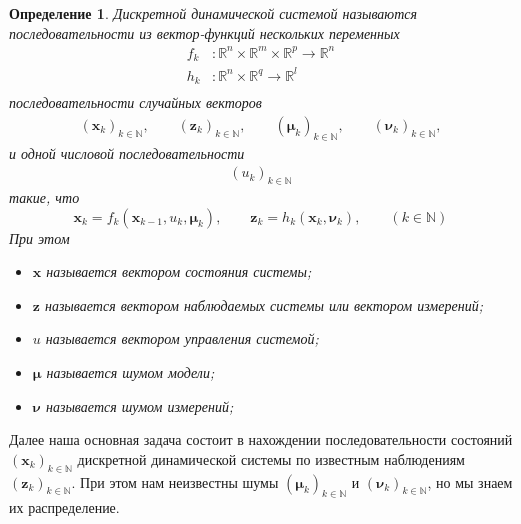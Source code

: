 \documentclass[12pt]{article}
\newtheorem{definition}[theorem]{Определение}
\begin{document}
\begin{definition}
    Дискретной динамической системой называются последовательности из вектор-функций нескольких переменных
    \begin{equation}
        \begin{aligned}
            f_k & :\mathbb{R}^n\times \mathbb{R}^m\times \mathbb{R}^p\to\mathbb{R}^n \\
            h_k & :\mathbb{R}^n\times\mathbb{R}^q\to\mathbb{R}^l                     \\
        \end{aligned}
    \end{equation}
    последовательности случайных векторов
    \begin{equation}
        \begin{aligned}
            (\pmb{x}_k)_{k\in\mathbb{N}}, \qquad
            (\pmb{z}_k)_{k\in\mathbb{N}}, \qquad
            (\pmb{\mu}_k)_{k\in\mathbb{N}}, \qquad
            (\pmb{\nu}_k)_{k\in\mathbb{N}},
        \end{aligned}
    \end{equation}
    и одной числовой последовательности
    \begin{equation}
        \begin{aligned}
            (u_k)_{k\in\mathbb{N}}
        \end{aligned}
    \end{equation}
    такие, что
    \begin{equation}
        \pmb{x}_{k}=f_k(\pmb{x}_{k-1}, u_k, \pmb{\mu}_k), \qquad
        \pmb{z}_k=h_k(\pmb{x}_k, \pmb{\nu}_k), \qquad
        (k\in\mathbb{N})
    \end{equation}
    При этом
    \begin{itemize}
        \item[] $\pmb{x}$ называется вектором состояния системы;
        \item[] $\pmb{z}$ называется вектором наблюдаемых системы или вектором измерений;
        \item[] $u$ называется вектором управления системой;
        \item[] $\pmb{\mu}$ называется шумом модели;
        \item[] $\pmb{\nu}$ называется шумом измерений;
    \end{itemize}
\end{definition}

Далее наша основная задача состоит в нахождении последовательности
состояний $(\pmb{x}_k)_{k\in\mathbb{N}}$ дискретной динамической системы
по известным наблюдениям $(\pmb{z}_k)_{k\in\mathbb{N}}$. При этом нам неизвестны
шумы $(\pmb{\mu}_k)_{k\in\mathbb{N}}$ и $(\pmb{\nu}_k)_{k\in\mathbb{N}}$,
но мы знаем их распределение.
\end{document}
